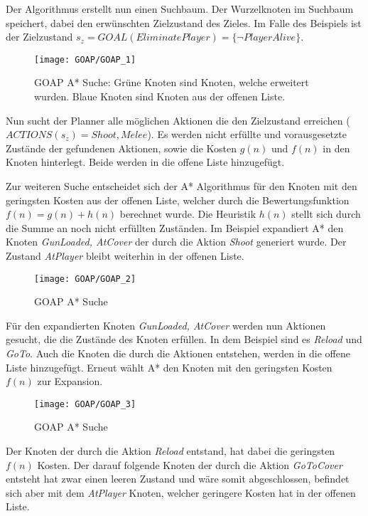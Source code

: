 Der Algorithmus erstellt nun einen Suchbaum. Der Wurzelknoten im Suchbaum speichert, dabei den erwünschten Zielzustand des Zieles. Im Falle des Beispiels ist der Zielzustand $s_z = GOAL(EliminatePlayer) = \{\lnot PlayerAlive\}$.

\begin{figure}[h]
  \centering
  \texttt{[image: GOAP/GOAP\_1]}
	\captionsetup{justification=justified, format=plain}
  \caption{GOAP A* Suche: Grüne Knoten sind Knoten, welche erweitert wurden. Blaue Knoten sind Knoten aus der offenen Liste.}
  \label{GOAP A* Suche: Erste Aktionen}
\end{figure}

Nun sucht der Planner alle möglichen Aktionen die den Zielzustand erreichen ($ACTIONS(s_z) = {Shoot, Melee}$). Es werden nicht erfüllte und vorausgesetzte Zustände der gefundenen Aktionen, sowie die Kosten $g(n)$ und $f(n)$ in den Knoten hinterlegt. Beide werden in die offene Liste hinzugefügt.

Zur weiteren Suche entscheidet sich der A* Algorithmus für den Knoten mit den geringsten Kosten aus der offenen Liste, welcher durch die Bewertungsfunktion $f(n) = g(n) + h(n)$ berechnet wurde. Die Heuristik $h(n)$ stellt sich durch die Summe an noch nicht erfüllten Zuständen. Im Beispiel expandiert A* den Knoten \textit{GunLoaded, AtCover} der durch die Aktion \textit{Shoot} generiert wurde. Der Zustand \textit{AtPlayer} bleibt weiterhin in der offenen Liste.

\begin{figure}[h]
  \centering
  \texttt{[image: GOAP/GOAP\_2]}
	\captionsetup{justification=justified, format=plain}
  \caption{GOAP A* Suche}
  \label{GOAP A* Suche: Erste Aktionen}
\end{figure}

Für den expandierten Knoten \textit{GunLoaded, AtCover} werden nun Aktionen gesucht, die die Zustände des Knoten erfüllen. In dem Beispiel sind es \textit{Reload} und \textit{GoTo}. Auch die Knoten die durch die Aktionen entstehen, werden in die offene Liste hinzugefügt. Erneut wählt A* den Knoten mit den geringsten Kosten $f(n)$ zur Expansion.
\clearpage

\begin{figure}[h]
  \centering
  \texttt{[image: GOAP/GOAP\_3]}
	\captionsetup{justification=justified, format=plain}
  \caption{GOAP A* Suche}
  \label{GOAP A* Suche: Erste Aktionen}
\end{figure}

Der Knoten der durch die Aktion \textit{Reload} entstand, hat dabei die geringsten $f(n)$ Kosten. Der darauf folgende Knoten der durch die Aktion \textit{GoToCover} entsteht hat zwar einen leeren Zustand und wäre somit abgeschlossen, befindet sich aber mit dem \textit{AtPlayer} Knoten, welcher geringere Kosten hat in der offenen Liste.
\clearpage

